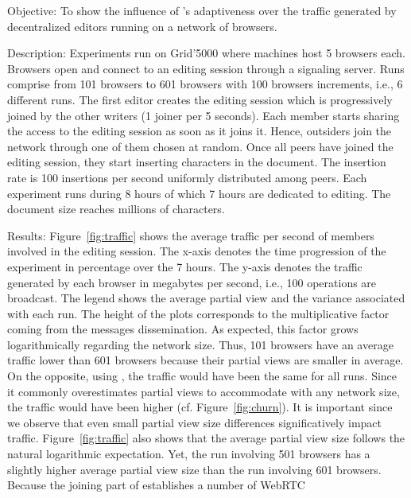 \begin{asparadesc}
\item [Objective:] To show the influence of \SPRAY's adaptiveness over the
  traffic generated by decentralized editors running on a network of browsers.
\item [Description:] Experiments run on Grid'5000 where machines host 5 browsers
  each. Browsers open \CRATE and connect to an editing session through a
  signaling server.  Runs comprise from 101 browsers to 601 browsers with 100
  browsers increments, i.e., 6 different runs.  The first editor creates the
  editing session which is progressively joined by the other writers (1 joiner
  per 5 seconds). Each member starts sharing the access to the editing session
  as soon as it joins it. Hence, outsiders join the network through one of them
  chosen at random. Once all peers have joined the editing session, they start
  inserting characters in the document. The insertion rate is 100 insertions per
  second uniformly distributed among peers. Each experiment runs during 8 hours
  of which 7 hours are dedicated to editing. The document size reaches millions
  of characters.
\item [Results:] Figure~\ref{fig:traffic} shows the average traffic per second
  of members involved in the editing session. The x-axis denotes the time
  progression of the experiment in percentage over the 7 hours. The y-axis
  denotes the traffic generated by each browser in megabytes per second, i.e.,
  100 operations are broadcast. The legend shows the average partial view and the
  variance associated with each run. The height of the plots corresponds to the
  multiplicative factor coming from the messages dissemination. As expected,
  this factor grows logarithmically regarding the network size. Thus, 101
  browsers have an average traffic lower than 601 browsers because their partial
  views are smaller in average.  On the opposite, using \CYCLON, the traffic
  would have been the same for all runs. Since it commonly overestimates partial
  views to accommodate with any network size, the traffic would have been higher
  (cf. Figure~\ref{fig:churn}). It is important since we observe that even small
  partial view size differences significatively impact traffic.
  Figure~\ref{fig:traffic} also shows that the average partial view size follows
  the natural logarithmic expectation. Yet, the run involving 501 browsers has a
  slightly higher average partial view size than the run involving 601
  browsers. Because the joining part of \SPRAY establishes a number of WebRTC

\end{asparadesc}

